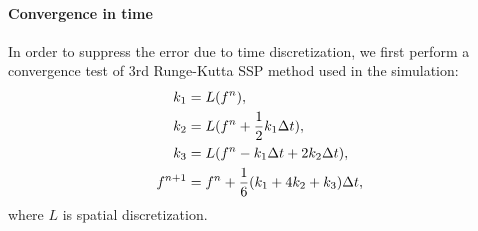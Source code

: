 \documentclass[review, times]{elsarticle}
\begin{document}

\paragraph{\bf Convergence in time} In order to suppress the error due to time discretization, we first perform a convergence test of 3rd Runge-Kutta SSP method used in the simulation:
\begin{align}
  k_1 &= L(f^n), \notag \\
  k_2 &= L(f^n + \frac{1}{2}k_1\Delta t), \notag \\
  k_3 &= L(f^n - k_1\Delta t + 2k_2\Delta t), \notag \\
  f^{n+1} &= f^n + \frac{1}{6}(k_1 + 4k_2 + k_3)\Delta t,
\end{align}
where $L$ is spatial discretization.

\end{document}
